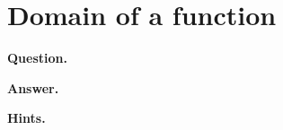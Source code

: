 \documentclass{article}
\begin{document}
\section*{Domain of a function}
\textbf{Question.} 

\textbf{Answer.} 

\textbf{Hints.}
\begin{itemize}

\end{itemize}
\end{document}
